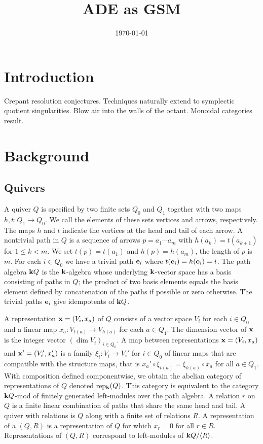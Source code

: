 \documentclass{amsart}
\title{ADE as GSM}
\date{\today}
\theoremstyle{definition}
\begin{document}
\maketitle

\section{Introduction}
Crepant resolution conjectures.
Techniques naturally extend to symplectic quotient singularities.
Blow air into the walls of the octant.
Monoidal categories result.


\section{Background}\label{sc:background}

\subsection{Quivers}
A quiver $Q$ is specified by two finite sets $Q_0$ and $Q_1$ together with two maps $h, t \colon Q_1 \rightarrow Q_0$. We call the elements of these sets vertices and arrows, respectively.  The maps $h$ and $t$ indicate the vertices at the head and tail of each arrow.
A nontrivial path in $Q$ is a sequence of arrows $p = a_1 \dotsb a_m$ with $h(a_{k}) = t(a_{k+1})$ for $1 \leq k < m$.  We set $t(p) = t(a_{1})$ and $h(p)= h(a_m)$, the length of $p$ is $m$.  
For each $i \in Q_0$ we have a trivial path $\mathbf{e}_i$ where $t(\mathbf{e}_i) = h(\mathbf{e}_i) = i$.  
The path algebra $\mathbf{k} Q$ is the $\mathbf{k}$-algebra whose underlying $\mathbf{k}$-vector space has a basis consisting of paths in $Q$; the product of two basis elements equals the basis element defined by concatenation of the paths if possible or zero otherwise.
The trivial paths $\mathbf{e}_i$ give idempotents of $\mathbf{k} Q$.

A representation $\mathbf{x} = (V_i, x_a)$ of $Q$ consists of a vector space $V_i$ for each $i \in Q_0$ and a linear map $x_a \colon V_{t(a)} \rightarrow V_{h(a)}$ for each $a \in Q_1$. 
The dimension vector of $\mathbf{x}$ is the integer vector $(\dim V_{i})_{i\in Q_0}$.  
A map between representations $\mathbf{x} = (V_i, x_a)$ and $\mathbf{x}' = (V_i', x_a')$ is a family $\xi_{i} \colon V_i^{\,} \rightarrow V_i'$ for $i \in Q_0$ of linear maps that are compatible with the structure maps, that is $x_a' \circ\xi_{t(a)} = \xi_{h(a)} \circ x_a$ for all $a \in Q_1$.  
With composition defined componentwise, we obtain the abelian category of representations of $Q$ denoted rep$_{\mathbf{k}}(Q)$. 
This category is equivalent to the category $\mathbf{k} Q$-mod of finitely generated left-modules over the path algebra.
A relation $r$ on $Q$ is a finite linear combination of paths that share the same head and tail.
A quiver with relations is $Q$ along with a finite set of relations $R$.
A representation of a $(Q,R)$ is a representation of $Q$ for which $x_r=0$ for all $r\in R$.
Representations of $(Q,R)$ correspond to left-modules of $\mathbf{k} Q/ \langle R \rangle$.
\end{document}
